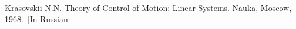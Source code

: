 \documentclass[12pt]{llncs}
\begin{document}



\begin{thebibliography}{9} %

Krasovskii N.N. Theory of Control of Motion: Linear Systems. Nauka, Moscow, 1968.~[In Russian]

\end{thebibliography}

\end{document}
